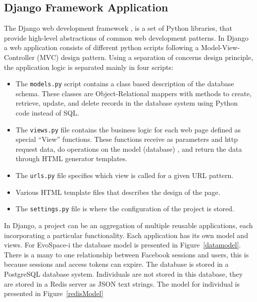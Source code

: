 \documentclass{sig-alternate}
\begin{document}
\subsection{Django Framework Application}
The Django web development framework \cite{django}, is a set of Python libraries, that provide high-level abstractions of common web development patterns. In Django a web application consists of different python scripts following a Model-View-Controller (MVC) design pattern. Using a separation of concerns design principle, the application logic is separated mainly in four scripts:
\begin{itemize}
	\item The \texttt{models.py} script contains a class based description of the database schema. These classes are Object-Relational mappers with methods to create, retrieve, update, and delete records in the database system using Python code instead of SQL.
	\item The \texttt{views.py} file contains the business logic for each web page defined as special  ``View'' functions. These functions receive as parameters and http request data, do operations on the model (database) , and return the data through HTML generator templates.
	\item The \texttt{urls.py} file specifies which view is called for a given URL pattern.
    \item Various HTML template files that describes the design of the page.
    \item The \texttt{settings.py} file is where the configuration of the project is stored.
\end{itemize}

In Django, a project can be an aggregation of multiple reusable applications, each incorporating a particular functionality. Each application has its own model and views. For EvoSpace-i the database model is presented in Figure~\ref{datamodel}. There is a many to one relationship between Facebook sessions and users, this is because sessions and access tokens can expire. The database is stored in a PostgreSQL database system. Individuals are not stored in this database, they are stored in a Redis server as JSON text strings. The model for individual is presented in Figure~\ref{redisModel}
\end{document}
